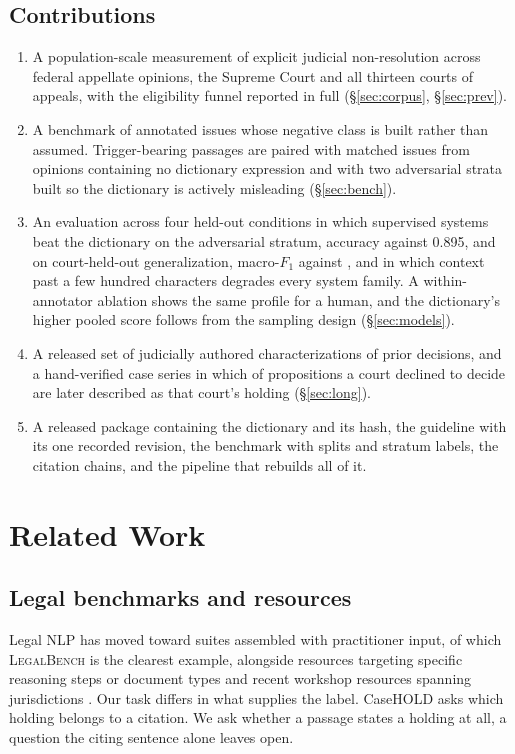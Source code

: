 \documentclass[11pt]{article}
\begin{document}
\subsection{Contributions}
\begin{enumerate}\setlength{\itemsep}{1pt}
\item A population-scale measurement of explicit judicial non-resolution across
\NFedApp{} federal appellate opinions, the Supreme Court and all thirteen courts
of appeals, with the eligibility funnel reported in full (\S\ref{sec:corpus},
\S\ref{sec:prev}).
\item A benchmark of \NBench{} annotated issues whose negative class is built rather
than assumed. Trigger-bearing passages are paired with matched issues from
opinions containing no dictionary expression and with two adversarial strata
built so the dictionary is actively misleading (\S\ref{sec:bench}).
\item An evaluation across four held-out conditions in which supervised systems
beat the dictionary on the adversarial stratum, \TfidfHOne{} accuracy against 0.895,
and on court-held-out generalization, \EncCourt{} macro-$F_1$ against \LexCourt{}, and in
which context past a few hundred characters degrades every system family. A
within-annotator ablation shows the same profile for a human, and the
dictionary's higher pooled score follows from the sampling design
(\S\ref{sec:models}).
\item A released set of \NCharTight{} judicially authored characterizations of prior
decisions, and a hand-verified case series in which \NIMEsc{} of \NIMDistinct{} propositions a court
declined to decide are later described as that court's holding
(\S\ref{sec:long}).
\item A released package containing the dictionary and its hash, the guideline
with its one recorded revision, the benchmark with splits and stratum labels, the
citation chains, and the pipeline that rebuilds all of it.
\end{enumerate}

\section{Related Work}

\subsection{Legal benchmarks and resources} Legal NLP has moved toward suites
assembled with practitioner input, of which \textsc{LegalBench}
\citep{guha2023legalbench} is the clearest example, alongside resources targeting
specific reasoning steps or document types \citep{zheng2021casehold,
chalkidis2022lexglue, hendrycks2021cuad} and recent workshop resources spanning
jurisdictions \citep{xie2024clcuket, jang2025pilot}. Our task differs in what
supplies the label. CaseHOLD asks which holding belongs to a citation. We ask
whether a passage states a holding at all, a question the citing sentence alone
leaves open.
\end{document}
